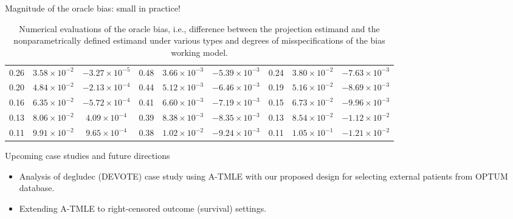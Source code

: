 \documentclass[t]{beamer}
\begin{document}
\begin{frame}{Magnitude of the oracle bias: small in practice!}
\begin{table}[]
{\begin{tabular}{|cll|rll|lll|}
  \multicolumn{1}{c}{0.26} & \multicolumn{1}{c}{$3.58 \times 10^{-2}$} & \multicolumn{1}{c|}{$-3.27 \times 10^{-5}$} & \multicolumn{1}{c}{0.48} & \multicolumn{1}{c}{$3.66 \times 10^{-3}$} & \multicolumn{1}{l|}{$-5.39 \times 10^{-3}$} & \multicolumn{1}{c}{0.24} & \multicolumn{1}{c}{$3.80 \times 10^{-2}$} & \multicolumn{1}{c}{$-7.63 \times 10^{-3}$}  \\ 
  \multicolumn{1}{c}{0.20} & \multicolumn{1}{c}{$4.84 \times 10^{-2}$} & \multicolumn{1}{c|}{$-2.13 \times 10^{-4}$} & \multicolumn{1}{c}{0.44} & \multicolumn{1}{c}{$5.12 \times 10^{-3}$} & \multicolumn{1}{l|}{$-6.46 \times 10^{-3}$} & \multicolumn{1}{c}{0.19} & \multicolumn{1}{c}{$5.16 \times 10^{-2}$} & \multicolumn{1}{c}{$-8.69 \times 10^{-3}$} \\ 
  \multicolumn{1}{c}{0.16} & \multicolumn{1}{c}{$6.35 \times 10^{-2}$} & \multicolumn{1}{c|}{$-5.72 \times 10^{-4}$} & \multicolumn{1}{c}{0.41} & \multicolumn{1}{c}{$6.60 \times 10^{-3}$} & \multicolumn{1}{l|}{$-7.19 \times 10^{-3}$} & \multicolumn{1}{c}{0.15} & \multicolumn{1}{c}{$6.73 \times 10^{-2}$} & \multicolumn{1}{c}{$-9.96 \times 10^{-3}$} \\ 
  \multicolumn{1}{c}{0.13} & \multicolumn{1}{c}{$8.06 \times 10^{-2}$} & \multicolumn{1}{c|}{$4.09 \times 10^{-4}$} & \multicolumn{1}{c}{0.39} & \multicolumn{1}{c}{$8.38 \times 10^{-3}$} & \multicolumn{1}{l|}{$-8.35 \times 10^{-3}$} & \multicolumn{1}{c}{0.13} & \multicolumn{1}{c}{$8.54 \times 10^{-2}$} & \multicolumn{1}{c}{$-1.12 \times 10^{-2}$} \\ 
  \multicolumn{1}{c}{0.11} & \multicolumn{1}{c}{$9.91 \times 10^{-2}$} & \multicolumn{1}{c|}{$9.65 \times 10^{-4}$} & \multicolumn{1}{c}{0.38} & \multicolumn{1}{c}{$1.02 \times 10^{-2}$} & \multicolumn{1}{l|}{$-9.24 \times 10^{-3}$}  & \multicolumn{1}{c}{0.11} & \multicolumn{1}{c}{$1.05 \times 10^{-1}$} & \multicolumn{1}{c}{$-1.21 \times 10^{-2}$} \\ 
  \bottomrule
  \end{tabular}
}
\caption{Numerical evaluations of the oracle bias, i.e., difference between the projection estimand and the nonparametrically defined estimand under various types and degrees of misspecifications of the bias working model.}
\end{table}
\end{frame}
\begin{frame}{Upcoming case studies and future directions}
\begin{itemize}
\item Analysis of degludec (DEVOTE) case study using A-TMLE with our proposed design for selecting external patients from OPTUM database.
\item Extending A-TMLE to right-censored outcome (survival) settings.
\end{itemize}
\end{frame}
\end{document}
